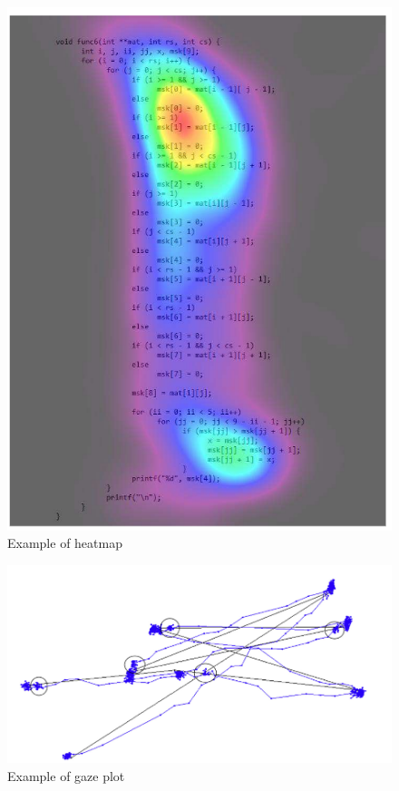 \begin{figure} [H]
  \centering
  \includegraphics[scale=1]{figures/hm.png}
  \caption{Example of heatmap \cite{jbara2017programmers}}
  \label{fig:AnhangsChor}
\end{figure}


\begin{figure} [H]
  \centering
  \includegraphics[scale=1]{figures/gaze.png}
  \caption{Example of gaze plot \cite{blignaut2019visualization}}
  \label{fig:AnhangsChor}
\end{figure}


